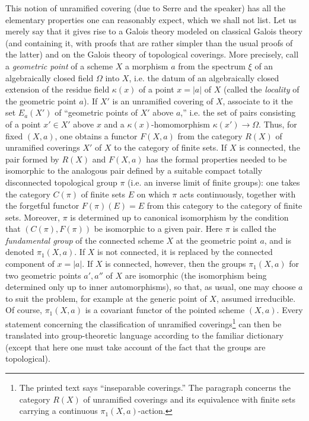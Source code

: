 This notion of unramified covering (due to Serre and the speaker) has all the
elementary properties one can reasonably expect, which we shall not list. Let
us merely say that it gives rise to a Galois theory modeled on classical
Galois theory (and containing it, with proofs that are rather simpler than the
usual proofs of the latter) and on the Galois theory of topological coverings.
More precisely, call a \emph{geometric point} of a scheme $X$ a morphism $a$
from the spectrum $\xi$ of an algebraically closed field $\Omega$ into $X$,
i.e. the datum of an algebraically closed extension of the residue field
$\kappa(x)$ of a point $x=|a|$ of $X$ (called the \emph{locality} of the
geometric point $a$). If $X'$ is an unramified covering of $X$, associate to it
the set $E_a(X')$ of “geometric points of $X'$ above $a$,” i.e. the set of
pairs consisting of a point $x'\in X'$ above $x$ and a
$\kappa(x)$-homomorphism $\kappa(x')\longrightarrow\Omega$. Thus, for fixed
$(X,a)$, one obtains a functor $F(X,a)$ from the category $R(X)$ of unramified
coverings $X'$ of $X$ to the category of finite sets. If $X$ is connected, the
pair formed by $R(X)$ and $F(X,a)$ has the formal properties needed to be
isomorphic to the analogous pair defined by a suitable compact totally
disconnected topological group $\pi$ (i.e. an inverse limit of finite groups):
one takes the category $C(\pi)$ of finite sets $E$ on which $\pi$ acts
continuously, together with the forgetful functor $F(\pi)(E)=E$ from this
category to the category of finite sets. Moreover, $\pi$ is determined up to
canonical isomorphism by the condition that $(C(\pi),F(\pi))$ be isomorphic to
a given pair. Here $\pi$ is called the \emph{fundamental group} of the
connected scheme $X$ at the geometric point $a$, and is denoted $\pi_1(X,a)$.
If $X$ is not connected, it is replaced by the connected component of
$x=|a|$. If $X$ is connected, however, then the groups $\pi_1(X,a)$ for two
geometric points $a',a''$ of $X$ are isomorphic (the isomorphism being
determined only up to inner automorphisms), so that, as usual, one may choose
$a$ to suit the problem, for example at the generic point of
$X$, assumed irreducible. Of course, $\pi_1(X,a)$ is a covariant functor of the
pointed scheme $(X,a)$. Every statement concerning the classification of
unramified coverings\footnote{The printed text says “inseparable coverings.”
The paragraph concerns the category $R(X)$ of unramified coverings and its
equivalence with finite sets carrying a continuous $\pi_1(X,a)$-action.} can
then be translated into group-theoretic language according to the familiar
dictionary (except that here one must take account of the fact that the groups
are topological).

